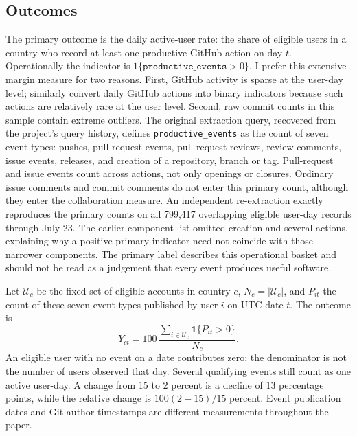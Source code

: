 \subsection{Outcomes}
\label{sec:outcomes}

The primary outcome is the daily active-user rate: the share of eligible users in a country who record at least one productive GitHub action on day $t$. Operationally the indicator is $1\{\texttt{productive\_events}>0\}$. I prefer this extensive-margin measure for two reasons. First, GitHub activity is sparse at the user-day level; \citet{kreitmeir2024} similarly convert daily GitHub actions into binary indicators because such actions are relatively rare at the user level. Second, raw commit counts in this sample contain extreme outliers. The original extraction query, recovered from the project's query history, defines \texttt{productive\_events} as the count of seven event types: pushes, pull-request events, pull-request reviews, review comments, issue events, releases, and creation of a repository, branch or tag. Pull-request and issue events count across actions, not only openings or closures. Ordinary issue comments and commit comments do not enter this primary count, although they enter the collaboration measure. An independent re-extraction exactly reproduces the primary counts on all 799,417 overlapping eligible user-day records through July 23. The earlier component list omitted creation and several actions, explaining why a positive primary indicator need not coincide with those narrower components. The primary label describes this operational basket and should not be read as a judgement that every event produces useful software.

Let $\mathcal U_c$ be the fixed set of eligible accounts in country $c$, $N_c=|\mathcal U_c|$, and $P_{it}$ the count of these seven event types published by user $i$ on UTC date $t$. The outcome is
\begin{equation}
 Y_{ct}=100\,\frac{\sum_{i\in\mathcal U_c}\mathbf1\{P_{it}>0\}}{N_c}.
 \label{eq:primary_outcome}
\end{equation}
An eligible user with no event on a date contributes zero; the denominator is not the number of users observed that day. Several qualifying events still count as one active user-day. A change from 15 to 2 percent is a decline of 13 percentage points, while the relative change is $100(2-15)/15$ percent. Event publication dates and Git author timestamps are different measurements throughout the paper.

